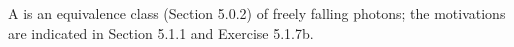 A  is an equivalence class (Section 5.0.2) of freely falling photons; the motivations are indicated in Section 5.1.1 and Exercise 5.1.7b.
